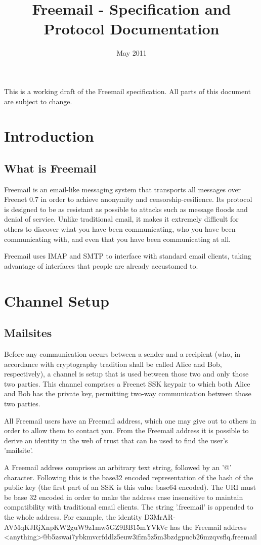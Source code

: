 \documentclass[12pt,a4paper]{article}
\begin{document}
\title{Freemail - Specification and Protocol Documentation}
\date{May 2011}
\maketitle

This is a working draft of the Freemail specification. All parts of this document are subject to
change.

\section{Introduction}
\subsection{What is Freemail}
Freemail is an email-like messaging system that transports all messages over Freenet 0.7 in order to
achieve anonymity and censorship-resilience. Its protocol is designed to be as resistant as possible
to attacks such as message floods and denial of service. Unlike traditional email, it makes it
extremely difficult for others to discover what you have been communicating, who you have been
communicating with, and even that you have been communicating at all.

Freemail uses IMAP and SMTP to interface with standard email clients, taking advantage of interfaces
that people are already accustomed to.

\section{Channel Setup}
\subsection{Mailsites}
Before any communication occurs between a sender and a recipient (who, in accordance with
cryptography tradition shall be called Alice and Bob, respectively), a channel is setup that is used
between those two and only those two parties. This channel comprises a Freenet SSK keypair to which
both Alice and Bob has the private key, permitting two-way communication between those two parties.

All Freemail users have an Freemail address, which one may give out to others in order to allow them
to contact you. From the Freemail address it is possible to derive an identity in the web of trust
that can be used to find the user's 'mailsite'.

A Freemail address comprises an arbitrary text string, followed by an '@' character. Following this
is the base32 encoded representation of the hash of the public key (the first part of an SSK is
this value base64 encoded). The URI must be base 32 encoded in order to make the address case
insensitive to maintain compatibility with traditional email clients. The string '.freemail' is
appended to the whole address. For example, the identity D3MrAR-AVMqKJRjXnpKW2guW9z1mw5GZ9BB15mYVkVc
has the Freemail address <anything>@b5zswai7ybkmvcrfddlz5euw3ifzn5z5m3bzdgpucb26mzqvsflq.freemail
\end{document}
